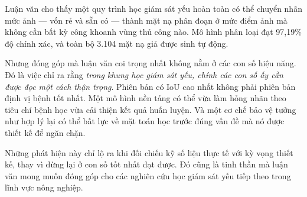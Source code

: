 Luận văn cho thấy một quy trình học giám sát yếu hoàn toàn có thể chuyển nhãn mức
ảnh --- vốn rẻ và sẵn có --- thành mặt nạ phân đoạn ở mức điểm ảnh mà không cần bất
kỳ công khoanh vùng thủ công nào. Mô hình phân loại đạt 97,19\% độ chính xác, và
toàn bộ 3.104 mặt nạ giả được sinh tự động.

Nhưng đóng góp mà luận văn coi trọng nhất không nằm ở các con số hiệu năng. Đó là
việc chỉ ra rằng \emph{trong khung học giám sát yếu, chính các con số ấy cần được
đọc một cách thận trọng}. Phiên bản có IoU cao nhất không phải phiên bản định vị
bệnh tốt nhất. Một mô hình nền tảng có thể vừa làm hỏng nhãn theo tiêu chí bệnh học
vừa cải thiện kết quả huấn luyện. Và một cơ chế bảo vệ tưởng như hợp lý lại có thể
bất lực về mặt toán học trước đúng vấn đề mà nó được thiết kế để ngăn chặn.

Những phát hiện này chỉ lộ ra khi đối chiếu kỹ số liệu thực tế với kỳ vọng thiết
kế, thay vì dừng lại ở con số tốt nhất đạt được. Đó cũng là tinh thần mà luận văn
mong muốn đóng góp cho các nghiên cứu học giám sát yếu tiếp theo trong lĩnh vực
nông nghiệp.
